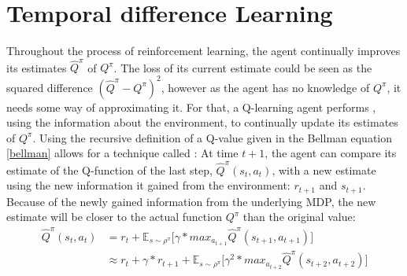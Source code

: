 \section{Temporal difference Learning}



Throughout the process of reinforcement learning, the agent continually improves its estimates $\hat{Q}^\pi$ of $Q^\pi$. The loss of its current estimate could be seen as the squared difference $(\hat{Q}^\pi - Q^\pi)^2$, however as the agent has no knowledge of $Q^\pi$, it needs some way of approximating it. For that, a Q-learning agent performs , using the information about the environment, to continually update its estimates of $Q^\pi$.
\noindent Using the recursive definition of a Q-value given in the Bellman equation \ref{bellman} allows for a technique called \cite{sutton_learning_1988}: At time $t+1$, the agent can compare its estimate of the Q-function of the last step, $\hat{Q}^\pi(s_t, a_t)$, with a new estimate using the new information it gained from the environment: $r_{t+1}$ and $s_{t+1}$.  Because of the newly gained information from the underlying MDP, the new estimate will be closer to the actual function $Q^\pi$ than the original value:
\begin{align} 
	\hat{Q}^\pi(s_t,a_t) &= r_t + \mathds{E}_{s\sim\rho^\pi} \big[ \gamma * max_{a_{t+1}} \hat{Q}^\pi(s_{t+1},a_{t+1})  \big]\\
	                     &\approx r_t + \gamma * r_{t+1} + \mathds{E}_{s\sim\rho^\pi} \big[ \gamma^2 * max_{a_{t+2}} \hat{Q}^\pi(s_{t+2},a_{t+2})  \big] \label{bellmanmal2}
\end{align}

